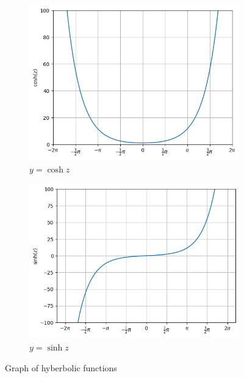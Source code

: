 \documentclass[../problems.tex]{subfiles}
\begin{document}
\begin{figure}[ht]
    \begin{subfigure}{0.49\textwidth}
        \includegraphics[width=\textwidth]{fig2_33a.png}
        \caption{$y = \cosh z$}
        \label{fig:2_33a}
    \end{subfigure}
    \begin{subfigure}{0.49\textwidth}
        \includegraphics[width=\textwidth]{fig2_33b.png}
        \caption{$y = \sinh z$}
        \label{fig:2_33b}
    \end{subfigure}
    \caption{Graph of hyberbolic functions}
    \label{fig:2_33}
\end{figure}
\end{document}
